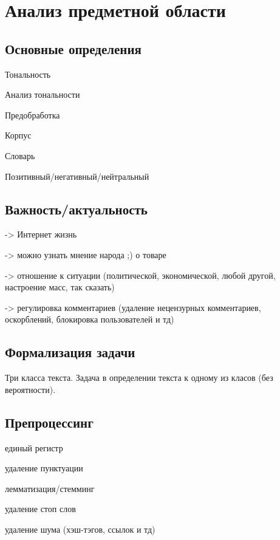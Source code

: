 \chapter{Анализ предметной области}

\section{Основные определения}

Тональность

Анализ тональности

Предобработка

Корпус

Словарь

Позитивный/негативный/нейтральный

\section{Важность/актуальность}

-> Интернет жизнь

-> можно узнать мнение народа ;) о товаре

-> отношение к ситуации (политической, экономической, любой другой, настроение
масс, так сказать)

-> регулировка комментариев (удаление нецензурных комментариев, оскорблений,
блокировка пользователей и тд)


\section{Формализация задачи}

Три класса текста. Задача в определении текста к одному из класов (без
вероятности).

\section{Препроцессинг}

единый регистр

удаление пунктуации

лемматизация/стемминг

удаление стоп слов

удаление шума (хэш-тэгов, ссылок и тд)

\nocite{*}
